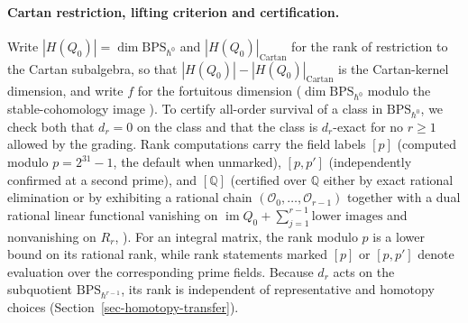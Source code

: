 \documentclass[11pt]{article}
\numberwithin{equation}{section}
\numberwithin{figure}{section}
\numberwithin{table}{section}
\newcommand{\HQ}{|H(Q_0)|}
\newcommand{\HQC}{|H(Q_0)|_{\mathrm{Cartan}}}
\begin{document}
\paragraph{Cartan restriction, lifting criterion and certification.}
Write $\HQ=\dim\mathrm{BPS}_{\hbar^0}$ and $\HQC$ for the rank of restriction to the Cartan subalgebra, so that $\HQ-\HQC$ is the Cartan-kernel dimension, and write $f$ for the fortuitous dimension ($\dim\mathrm{BPS}_{\hbar^0}$ modulo the stable-cohomology image \cite[supplement, Section S1.5]{Repo}). To certify all-order survival of a class in $\mathrm{BPS}_{\hbar^0}$, we check both that $d_r=0$ on the class and that the class is $d_r$-exact for no $r\ge1$ allowed by the grading. Rank computations carry the field labels $[p]$ (computed modulo $p=2^{31}-1$, the default when unmarked), $[p,p']$ (independently confirmed at a second prime), and $[\mathbb Q]$ (certified over $\mathbb Q$ either by exact rational elimination or by exhibiting a rational chain $(\mathcal O_0,\ldots,\mathcal O_{r-1})$ together with a dual rational linear functional vanishing on $\operatorname{im}Q_0+\sum_{j=1}^{r-1}\text{lower images}$ and nonvanishing on $R_r$, \cite[supplement, Section S1.7]{Repo}). For an integral matrix, the rank modulo $p$ is a lower bound on its rational rank, while rank statements marked $[p]$ or $[p,p']$ denote evaluation over the corresponding prime fields. Because $d_r$ acts on the subquotient $\mathrm{BPS}_{\hbar^{r-1}}$, its rank is independent of representative and homotopy choices (Section~\ref{sec-homotopy-transfer}).
\end{document}
